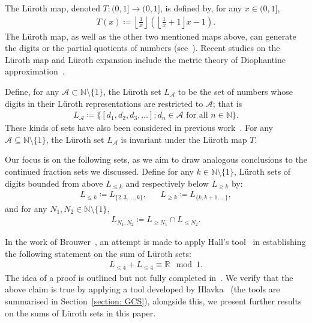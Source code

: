 \documentclass{ws-ijnt}
\begin{document}
	The L\"uroth map, denoted $T:(0,1]\to(0,1]$, is defined by, for any $x\in(0,1]$,
	\begin{align*}
		T(x)\coloneqq\left\lfloor\frac{1}{x}\right\rfloor\left(\left\lfloor\frac{1}{x}+1\right\rfloor x-1\right).
	\end{align*}
	The L\"uroth map, as well as the other two mentioned maps above, can generate the digits or the partial quotients of numbers (see~\cite{dajanikraaikamp2002ergodictheoryofnumbers}). Recent studies on the L\"uroth map and L\"uroth expansion include the metric theory of Diophantine approximation~\cite{cao2013efficiency,lee2025lurothexpansionsdiophantineapproximation,tan2021approximation,tan2021dimension}.
	
	Define, for any $\mathcal{A}\subset\mathbb{N}\setminus\{1\}$, the L\"uroth set $L_{\mathcal{A}}$ to be the set of numbers whose digits in their L\"uroth representations are restricted to $\mathcal{A}$; that is
	\begin{align*}
		L_{\mathcal{A}}
		\coloneqq \{[d_1, d_2, d_3, \dots] : d_n\in \mathcal{A} \text{ for all } n\in\mathbb{N}\}.
	\end{align*}
	These kinds of sets have also been considered in previous work~\cite{brouwer2024cantor,lee2024explicitupperboundsdecay}. For any $\mathcal{A}\subseteq\mathbb{N}\setminus\{1\}$, the L\"uroth set $L_{\mathcal{A}}$ is invariant under the L\"uroth map $T$.
	
	Our focus is on the following sets, as we aim to draw analogous conclusions to the continued fraction sets we discussed. Define for any $k\in\mathbb{N}\setminus\{1\}$, L\"uroth sets of digits bounded from above $L_{\leq k}$ and respectively below $L_{\geq k}$ by:
	\begin{align*}
		L_{\leq k}
		\coloneqq L_{\{2,3,\ldots,k\}}, &&
		L_{\geq k}
		\coloneqq L_{\{k,k+1,\ldots\}},
	\end{align*}
	and for any $N_1,N_2\in\mathbb{N}\setminus\{1\}$,
	\begin{align*}
		L_{N_1,N_2}\coloneqq L_{\geq N_1} \cap L_{\leq N_2}.
	\end{align*}
	
	In the work of Brouwer~\cite[(6.1)]{brouwer2024cantor}, an attempt is made to apply Hall's tool~\cite[Theorem 2.2]{hall1947} in establishing the following statement on the sum of L\"uroth sets:
	\begin{align*}
		L_{\leq 4}+L_{\leq 4} \equiv \mathbb{R} \mod 1.
	\end{align*}
	The idea of a proof is outlined but not fully completed in~\cite{brouwer2024cantor}. We verify that the above claim is true by applying a tool developed by Hlavka~\cite[Theorem 3]{Hlavka1975} (the tools are summarised in Section~\ref{section: GCS}), alongside this, we present further results on the sums of L\"uroth sets in this paper.
	
\end{document}
